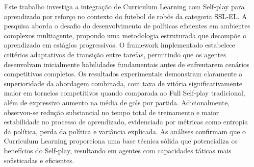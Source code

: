 
\begin{resumo} 
Este trabalho investiga a integração de Curriculum Learning com Self-play para aprendizado por reforço no contexto do futebol de robôs da categoria SSL-EL. A pesquisa aborda o desafio do desenvolvimento de políticas eficientes em ambientes complexos multiagente, propondo uma metodologia estruturada que decompõe o aprendizado em estágios progressivos. O framework implementado estabelece critérios adaptativos de transição entre tarefas, permitindo que os agentes desenvolvam inicialmente habilidades fundamentais antes de enfrentarem cenários competitivos completos. Os resultados experimentais demonstram claramente a superioridade da abordagem combinada, com taxa de vitória significativamente maior em torneios competitivos quando comparada ao Full Self-play tradicional, além de expressivo aumento na média de gols por partida. Adicionalmente, observou-se redução substancial no tempo total de treinamento e maior estabilidade no processo de aprendizado, evidenciada por métricas como entropia da política, perda da política e variância explicada. As análises confirmam que o Curriculum Learning proporciona uma base técnica sólida que potencializa os benefícios do Self-play, resultando em agentes com capacidades táticas mais sofisticadas e eficientes.
\end{resumo}

